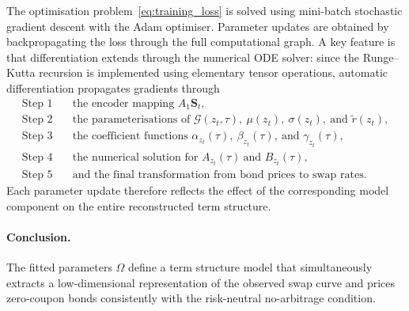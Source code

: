 The optimisation problem~\eqref{eq:training_loss} is solved using mini-batch stochastic gradient descent with the Adam optimiser. Parameter updates are obtained by backpropagating the loss through the full computational graph. A key feature is that differentiation extends through the numerical ODE solver: since the Runge--Kutta recursion is implemented using elementary tensor operations, automatic differentiation propagates gradients through
\begin{align*}
\text{Step 1} \quad & \text{the encoder mapping } A_1\mathbf{S}_t, \\
\text{Step 2} \quad & \text{the parameterisations of } \mathcal{G}(z_t,\tau),\ \mu(z_t),\ \sigma(z_t),\ \text{and } \tilde r(z_t), \\
\text{Step 3} \quad & \text{the coefficient functions } \alpha_{z_t}(\tau),\ \beta_{z_t}(\tau),\ \text{and } \gamma_{z_t}(\tau), \\
\text{Step 4} \quad & \text{the numerical solution for } A_{z_t}(\tau)\ \text{and } B_{z_t}(\tau), \\
\text{Step 5} \quad & \text{and the final transformation from bond prices to swap rates.}
\end{align*}
Each parameter update therefore reflects the effect of the corresponding model component on the entire reconstructed term structure.


\paragraph{Conclusion.}
The fitted parameters $\hat{\Omega}$ define a term structure model that simultaneously extracts a low-dimensional representation of the observed swap curve and prices zero-coupon bonds consistently with the risk-neutral no-arbitrage condition.